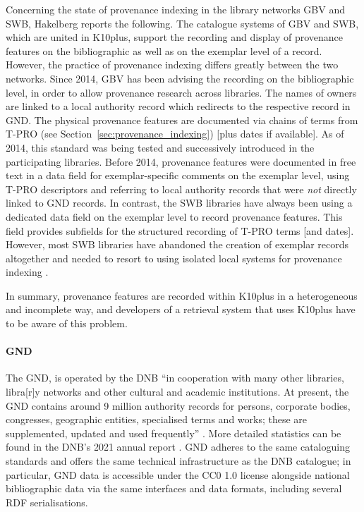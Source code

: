 Concerning the state of provenance indexing in the library networks \gls{GBV} and \gls{SWB},
Hakelberg \autocite*[§4]{Hakelberg2016} reports the following.
The catalogue systems of \gls{GBV} and \gls{SWB}, which are united in K10plus,
support the recording and display
of provenance features on the bibliographic as well as on the exemplar level of a record.
However, the practice of provenance indexing differs greatly between the two networks.
Since 2014, GBV has been advising the recording on the bibliographic level,
in order to allow provenance research across libraries. The names of owners are linked
to a local authority record which redirects to the respective record in \gls{GND}.
The physical provenance features are documented via chains of terms from
\gls{T-PRO} (see Section~\ref{sec:provenance_indexing}) [plus dates if available].
As of 2014,
this standard was being tested and successively introduced in the participating libraries.
Before 2014, provenance features were documented in free text in a data field for
exemplar-specific comments on the exemplar level, using \gls{T-PRO} descriptors 
and referring to local authority records that were \emph{not} directly linked to \gls{GND} records.
In contrast, the \gls{SWB} libraries have always been using a dedicated data field
on the exemplar level to record provenance features.
This field provides subfields for the structured recording of T-PRO terms [and dates].
However, most \gls{SWB} libraries have abandoned the creation of exemplar records altogether
and needed to resort to using isolated local systems for provenance indexing \autocite[cf.][]{Hakelberg2016}.

In summary, provenance features are recorded within K10plus in a heterogeneous
and incomplete way, and developers of a retrieval system that uses K10plus have to
be aware of this problem.

\paragraph{GND}

%
The \gls{GND}, is operated by the \gls{DNB}
\enquote{in cooperation with many other libraries, libra[r]y networks and other cultural and academic institutions.
At present, the GND contains around 9 million authority records for persons, corporate bodies, congresses, geographic entities, specialised terms and works; these are supplemented, updated and used frequently} \autocite{DNB_cataloguing}. More detailed statistics can be found in the DNB's
2021 annual report \autocite[p.49]{DNB_Jahresbericht_2021}.
GND adheres to the same cataloguing standards and offers the same technical infrastructure
as the DNB catalogue; in particular, GND data is accessible under the CC0 1.0 license alongside national bibliographic data
via the same interfaces and data formats, including several RDF serialisations.

